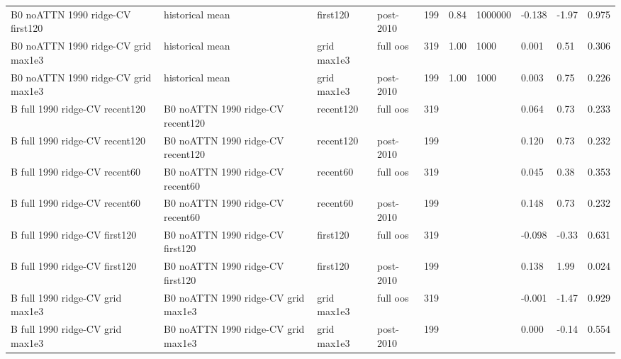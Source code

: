 \begin{table}[H]
\begin{adjustbox}{max width=\linewidth}
\begin{tabular}{llllrlllll}
B0 noATTN 1990 ridge-CV first120 & historical mean & first120 & post-2010 & 199 & 0.84 & 1000000 & -0.138 & -1.97 & 0.975 \\
B0 noATTN 1990 ridge-CV grid max1e3 & historical mean & grid max1e3 & full oos & 319 & 1.00 & 1000 & 0.001 & 0.51 & 0.306 \\
B0 noATTN 1990 ridge-CV grid max1e3 & historical mean & grid max1e3 & post-2010 & 199 & 1.00 & 1000 & 0.003 & 0.75 & 0.226 \\
B full 1990 ridge-CV recent120 & B0 noATTN 1990 ridge-CV recent120 & recent120 & full oos & 319 &  &  & 0.064 & 0.73 & 0.233 \\
B full 1990 ridge-CV recent120 & B0 noATTN 1990 ridge-CV recent120 & recent120 & post-2010 & 199 &  &  & 0.120 & 0.73 & 0.232 \\
B full 1990 ridge-CV recent60 & B0 noATTN 1990 ridge-CV recent60 & recent60 & full oos & 319 &  &  & 0.045 & 0.38 & 0.353 \\
B full 1990 ridge-CV recent60 & B0 noATTN 1990 ridge-CV recent60 & recent60 & post-2010 & 199 &  &  & 0.148 & 0.73 & 0.232 \\
B full 1990 ridge-CV first120 & B0 noATTN 1990 ridge-CV first120 & first120 & full oos & 319 &  &  & -0.098 & -0.33 & 0.631 \\
B full 1990 ridge-CV first120 & B0 noATTN 1990 ridge-CV first120 & first120 & post-2010 & 199 &  &  & 0.138 & 1.99 & 0.024 \\
B full 1990 ridge-CV grid max1e3 & B0 noATTN 1990 ridge-CV grid max1e3 & grid max1e3 & full oos & 319 &  &  & -0.001 & -1.47 & 0.929 \\
B full 1990 ridge-CV grid max1e3 & B0 noATTN 1990 ridge-CV grid max1e3 & grid max1e3 & post-2010 & 199 &  &  & 0.000 & -0.14 & 0.554 \\
\bottomrule
\end{tabular}
\end{adjustbox}
\end{table}
